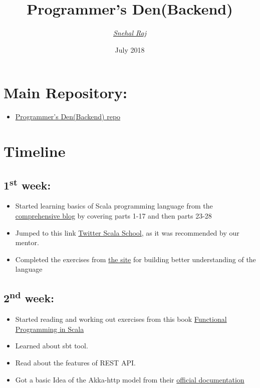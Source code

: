 \documentclass{article}
\title{Programmer's Den(Backend)}
\author{\href{mailto:snehal@iitk.ac.in}{\textit{Snehal Raj}}
        }
\date{July 2018}
\begin{document}
\maketitle
\section*{Main Repository:}
\begin{itemize}
    \item \href{https://github.com/SnehalRaj/Programmers_den}{Programmer's Den(Backend) repo}
\end{itemize}
\section*{\textbf{Timeline}}
\subsection*{1\textsuperscript{st} week:}
\begin{itemize}
    \item Started learning basics of Scala programming language from the \href{https://madusudanan.com/blog/scala-articles-index/}{comprehensive blog}  by covering parts 1-17 and then parts 23-28 
    \item Jumped to this link \href{https://twitter.github.io/scala_school/}{Twitter Scala School}, as it was recommended by our mentor.
   

 \item Completed the exercises from \href{https://www.scala-exercises.org/fp_in_scala/getting_started_with_functional_programming}{the site} for building better understanding of the language


\end{itemize}

\subsection*{2\textsuperscript{nd} week:}
\begin{itemize}
 \item Started reading and working out exercises  from this book \href{https://www.manning.com/books/functional-programming-in-scala}{Functional Programming in Scala}
    \item Learned about sbt tool.
    \item Read about the features of REST API.
    
    \item Got a basic Idea of the Akka-http model from their \href{https://doc.akka.io/docs/akka-http/current/introduction.html?language=scala}{official documentation} 
     
 
    \end{itemize}
    
\end{document}
